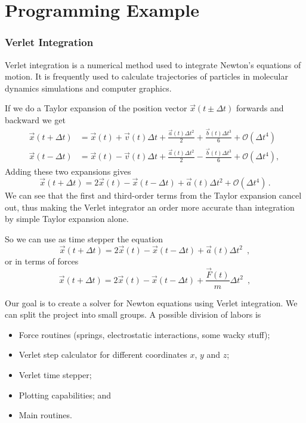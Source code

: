 \section[Example]{Programming Example}
\begin{frame}[allowframebreaks]
    \frametitle{Verlet Integration}
    
Verlet integration is a numerical method used to integrate Newton's equations of motion. It is frequently used to calculate trajectories of particles in molecular dynamics simulations and computer graphics.

If we do a Taylor expansion of the position vector $\vec{x}(t\pm\Delta t)$ forwards and backward we get
\begin{align*}
\vec{x}(t + \Delta t)
&= \vec{x}(t) + \vec{v}(t)\Delta t + \frac{\vec{a}(t) \Delta t^2}{2}
+ \frac{\vec{b}(t) \Delta t^3}{6} + \mathcal{O}(\Delta t^4)\\
\vec{x}(t - \Delta t)
&= \vec{x}(t) - \vec{v}(t)\Delta t + \frac{\vec{a}(t) \Delta t^2}{2}
- \frac{\vec{b}(t) \Delta t^3}{6} + \mathcal{O}(\Delta t^4), \,
\end{align*}
Adding these two expansions gives
\[\vec{x}(t + \Delta t) = 2\vec{x}(t) - \vec{x}(t - \Delta t) + \vec{a}(t) \Delta t^2 + \mathcal{O}(\Delta t^4)\, .\]
We can see that the first and third-order terms from the Taylor expansion cancel out, thus making the Verlet integrator an order more accurate than integration by simple Taylor expansion alone.

So we can use as time stepper the equation
\[\boxed{\vec{x}(t + \Delta t) = 2\vec{x}(t) - \vec{x}(t - \Delta t) + \vec{a}(t) \Delta t^2} \enspace ,\]
or in terms of forces
\[\boxed{\vec{x}(t + \Delta t) = 2\vec{x}(t) - \vec{x}(t - \Delta t) + \frac{\vec{F}(t)}{m} \Delta t^2} \enspace ,\]

Our goal is to create a solver for Newton equations using Verlet integration. We can split the project into small groups. A possible division of labors is
\begin{itemize}
\item Force routines (springs, electrostatic interactions, some wacky stuff);

\item Verlet step calculator for different coordinates $x$, $y$ and $z$;

\item Verlet time stepper;

\item Plotting capabilities; and

\item Main routines.
\end{itemize}
    
\end{frame}
\note{}


